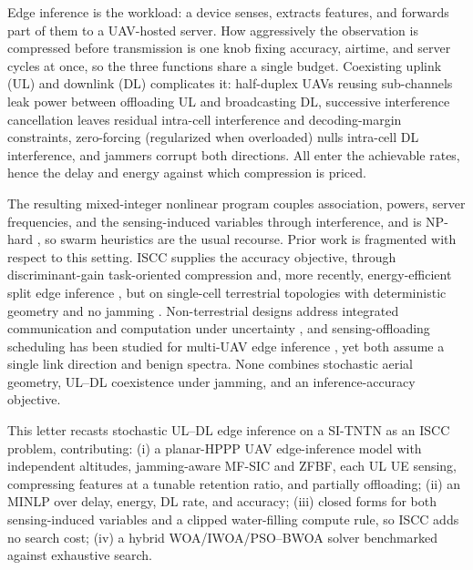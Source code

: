 \documentclass[journal]{IEEEtran}
\begin{document}
Edge inference is the workload: a device senses, extracts features, and forwards part of them to a UAV-hosted server. How aggressively the observation is compressed before transmission is one knob fixing accuracy, airtime, and server cycles at once, so the three functions share a single budget. Coexisting uplink (UL) and downlink (DL) complicates it: half-duplex UAVs reusing sub-channels leak power between offloading UL and broadcasting DL, successive interference cancellation leaves residual intra-cell interference and decoding-margin constraints, zero-forcing (regularized when overloaded) nulls intra-cell DL interference, and jammers corrupt both directions. All enter the achievable rates, hence the delay and energy against which compression is priced.

The resulting mixed-integer nonlinear program couples association, powers, server frequencies, and the sensing-induced variables through interference, and is NP-hard \cite{Hoang_TCOM_2024}, so swarm heuristics \cite{book_SI2010,genetic_optim} are the usual recourse. Prior work is fragmented with respect to this setting. ISCC supplies the accuracy objective, through discriminant-gain task-oriented compression \cite{wen2024iscc} and, more recently, energy-efficient split edge inference \cite{yao2025edgeinf}, but on single-cell terrestrial topologies with deterministic geometry and no jamming \cite{wen2025survey}. Non-terrestrial designs address integrated communication and computation under uncertainty \cite{tang2025ntn}, and sensing-offloading scheduling has been studied for multi-UAV edge inference \cite{du2026uavinf}, yet both assume a single link direction and benign spectra. None combines stochastic aerial geometry, UL--DL coexistence under jamming, and an inference-accuracy objective.

This letter recasts stochastic UL--DL edge inference on a SI-TNTN as an ISCC problem, contributing: (i) a planar-HPPP UAV edge-inference model with independent altitudes, jamming-aware MF-SIC and ZFBF, each UL UE sensing, compressing features at a tunable retention ratio, and partially offloading; (ii) an MINLP over delay, energy, DL rate, and accuracy; (iii) closed forms for both sensing-induced variables and a clipped water-filling compute rule, so ISCC adds no search cost; (iv) a hybrid WOA/IWOA/PSO--BWOA solver benchmarked against exhaustive search.
\end{document}
